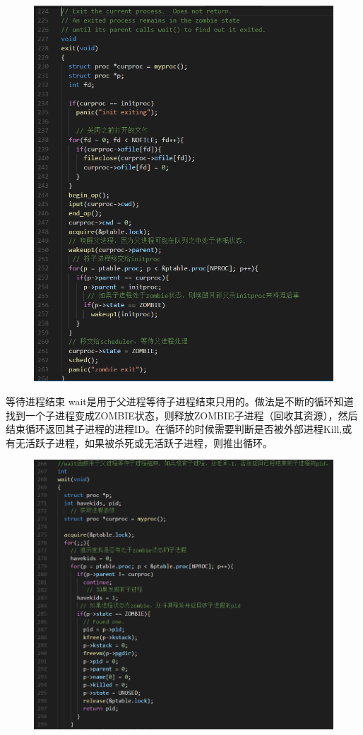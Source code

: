 \documentclass[a4paper,12pt]{report}
\begin{document}
\begin{figure}[H]
	\centering
	\includegraphics [width=1.0\textwidth]{figure//image112.png}
\end{figure}

等待进程结束
wait是用于父进程等待子进程结束只用的。做法是不断的循环知道找到一个子进程变成ZOMBIE状态，则释放ZOMBIE子进程（回收其资源），然后结束循环返回其子进程的进程ID。在循环的时候需要判断是否被外部进程Kill,或有无活跃子进程，如果被杀死或无活跃子进程，则推出循环。
\begin{figure}[H]
	\centering
	\includegraphics [width=1.0\textwidth]{figure//image113.png}
\end{figure}
\end{document}
